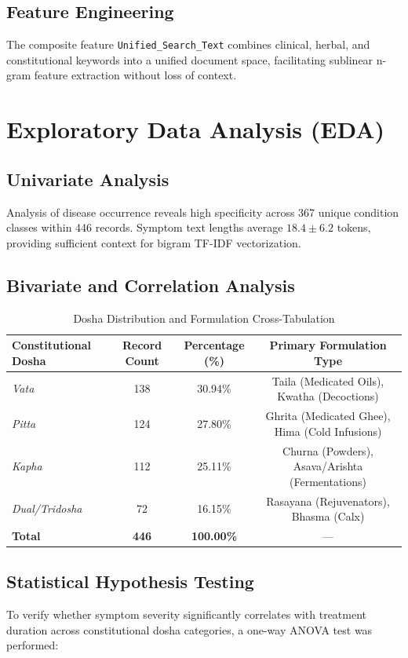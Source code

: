 \documentclass[12pt,a4paper]{article}
\begin{document}
\subsection{Feature Engineering}
The composite feature \texttt{Unified\_Search\_Text} combines clinical, herbal, and constitutional keywords into a unified document space, facilitating sublinear n-gram feature extraction without loss of context.

\newpage
\section{Exploratory Data Analysis (EDA)}

\subsection{Univariate Analysis}
Analysis of disease occurrence reveals high specificity across 367 unique condition classes within 446 records. Symptom text lengths average $18.4 \pm 6.2$ tokens, providing sufficient context for bigram TF-IDF vectorization.

\subsection{Bivariate and Correlation Analysis}
\begin{table}[H]
\centering
\caption{Dosha Distribution and Formulation Cross-Tabulation}
\label{tab:doshadist}
\begin{tabular}{|l|c|c|c|}
\hline
\textbf{Constitutional Dosha} & \textbf{Record Count} & \textbf{Percentage (\%)} & \textbf{Primary Formulation Type} \\
\hline
\textit{Vata} & 138 & 30.94\% & Taila (Medicated Oils), Kwatha (Decoctions) \\
\textit{Pitta} & 124 & 27.80\% & Ghrita (Medicated Ghee), Hima (Cold Infusions) \\
\textit{Kapha} & 112 & 25.11\% & Churna (Powders), Asava/Arishta (Fermentations) \\
\textit{Dual/Tridosha} & 72 & 16.15\% & Rasayana (Rejuvenators), Bhasma (Calx) \\
\hline
\textbf{Total} & \textbf{446} & \textbf{100.00\%} & --- \\
\hline
\end{tabular}
\end{table}

\subsection{Statistical Hypothesis Testing}
To verify whether symptom severity significantly correlates with treatment duration across constitutional dosha categories, a one-way ANOVA test was performed:
\end{document}
